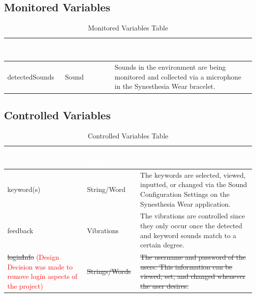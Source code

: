 \documentclass[12pt, titlepage]{article}
\begin{document}
\subsection{Monitored Variables}
\begin{table}[H]
  \centering
  \label{table:MonitoredVar Table} 
  \begin{tabular}{|p{5cm}|p{5cm}|p{5cm}|} 
  \hline
  \rowcolor[rgb]{0.071,0.49,0.698} \textcolor{white}{Monitored Name} & \textcolor{white}{Monitored Type} & \textcolor{white}{Description}                                          \\ 
  \hline
  \rowcolor[rgb]{0.675,0.827,0.902}   detectedSounds      & Sound &  Sounds in the environment are being monitored and collected via a microphone in the Synesthesia Wear bracelet. \\
  \hline
  \end{tabular}
  \caption{Monitored Variables Table}
\end{table}

\subsection{Controlled Variables}
\begin{table}[H]
  \centering
  \label{table:ControlledVar Table} 
  \begin{tabular}{|p{5cm}|p{5cm}|p{5cm}|} 
  \hline
  \rowcolor[rgb]{0.071,0.49,0.698} \textcolor{white}{Controlled Name} & \textcolor{white}{Controlled Type} & \textcolor{white}{Description}                                          \\ 
  \hline
  \rowcolor[rgb]{0.675,0.827,0.902}    keyword(s)     & String/Word &  The keywords are selected, viewed, inputted, or changed via the Sound Configuration Settings on the Synesthesia Wear application. \\
  \hline
  \rowcolor[rgb]{0.675,0.827,0.902}    feedback    &  Vibrations    &  The vibrations are controlled since they only occur once the detected and keyword sounds match to a certain degree.           \\
  \hline
  \rowcolor[rgb]{0.675,0.827,0.902}    \sout{loginInfo} \textcolor{red}{(Design Decision was made to remove login aspects of the project)}    &  \sout{Strings/Words}    &  \sout{The username and password of the users. This information can be viewed, set, and changed whenever the user desires.}           \\
  \hline
  \end{tabular}
  \caption{Controlled Variables Table}
\end{table}
\end{document}
